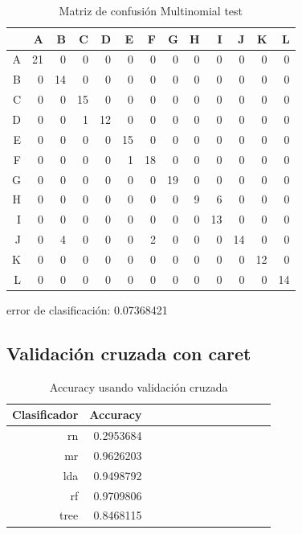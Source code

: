 \documentclass[pdf]{beamer}
\begin{document}
\begin{frame}
\begin{table}[ht]
\begin{adjustbox}{width= 3.5in,center}
\centering
\begin{tabular}{rrrrrrrrrrrrr}
  \hline
 & A & B & C & D & E & F & G & H & I & J & K & L \\ 
  \hline
A &  21 &   0 &   0 &   0 &   0 &   0 &   0 &   0 &   0 &   0 &   0 &   0 \\ 
  B &   0 &  14 &   0 &   0 &   0 &   0 &   0 &   0 &   0 &   0 &   0 &   0 \\ 
  C &   0 &   0 &  15 &   0 &   0 &   0 &   0 &   0 &   0 &   0 &   0 &   0 \\ 
  D &   0 &   0 &   1 &  12 &   0 &   0 &   0 &   0 &   0 &   0 &   0 &   0 \\ 
  E &   0 &   0 &   0 &   0 &  15 &   0 &   0 &   0 &   0 &   0 &   0 &   0 \\ 
  F &   0 &   0 &   0 &   0 &   1 &  18 &   0 &   0 &   0 &   0 &   0 &   0 \\ 
  G &   0 &   0 &   0 &   0 &   0 &   0 &  19 &   0 &   0 &   0 &   0 &   0 \\ 
  H &   0 &   0 &   0 &   0 &   0 &   0 &   0 &   9 &   6 &   0 &   0 &   0 \\ 
  I &   0 &   0 &   0 &   0 &   0 &   0 &   0 &   0 &  13 &   0 &   0 &   0 \\ 
  J &   0 &   4 &   0 &   0 &   0 &   2 &   0 &   0 &   0 &  14 &   0 &   0 \\ 
  K &   0 &   0 &   0 &   0 &   0 &   0 &   0 &   0 &   0 &   0 &  12 &   0 \\ 
  L &   0 &   0 &   0 &   0 &   0 &   0 &   0 &   0 &   0 &   0 &   0 &  14 \\ 
   \hline
\end{tabular}
\end{adjustbox}
	\label{tabla:confusionMLtest}
	\caption{Matriz de confusión Multinomial test}
\end{table}

error de clasificación: 0.07368421
\end{frame}

\subsection{Validación cruzada con caret}

\begin{frame}
\begin{table}[ht]
\centering
\begin{tabular}{rrrrrrrrrrrrr}
  \hline
Clasificador & Accuracy\\ 
  \hline
rn &   0.2953684  \\ 
mr &   0.9626203  \\ 
lda &   0.9498792 \\ 
rf &   0.9709806 \\ 
tree &   0.8468115\\ 
   \hline
\end{tabular}
	\label{tabla:AccuracyCV}
	\caption{Accuracy usando validación cruzada}
\end{table}
\end{frame}


\begin{frame}
\end{frame}
\end{document}
